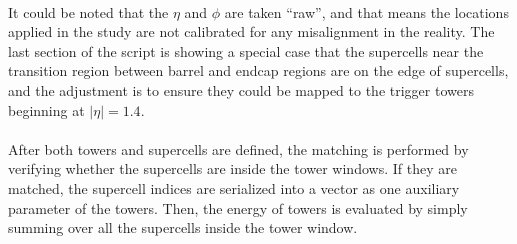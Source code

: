 \noindent
\\It could be noted that the $\eta$ and $\phi$ are taken ``raw'', and that means the locations applied in the study are not calibrated for any misalignment in the reality. The last section of the script is showing a special case that the supercells near the transition region between barrel and endcap regions are on the edge of supercells, and the adjustment is to ensure they could be mapped to the trigger towers beginning at $|\eta|=1.4$.
\\
\\After both towers and supercells are defined, the matching is performed by verifying whether the supercells are inside the tower windows. If they are matched, the supercell indices are serialized into a vector as one auxiliary parameter of the towers. Then, the energy of towers is evaluated by simply summing over all the supercells inside the tower window.
